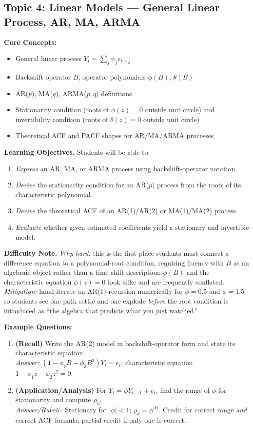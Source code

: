 \documentclass[11pt]{article}
\begin{document}
\subsection{Topic 4: Linear Models --- General Linear Process, AR, MA, ARMA}

\textbf{Core Concepts:}
\begin{itemize}
\item General linear process $Y_t = \sum_j \psi_j e_{t-j}$
\item Backshift operator $B$; operator polynomials $\phi(B)$, $\theta(B)$
\item AR($p$), MA($q$), ARMA($p,q$) definitions
\item Stationarity condition (roots of $\phi(z)=0$ outside unit circle) and invertibility condition (roots of $\theta(z)=0$ outside unit circle)
\item Theoretical ACF and PACF shapes for AR/MA/ARMA processes
\end{itemize}

\textbf{Learning Objectives.} Students will be able to:
\begin{enumerate}
\item \emph{Express} an AR, MA, or ARMA process using backshift-operator notation.
\item \emph{Derive} the stationarity condition for an AR($p$) process from the roots of its characteristic polynomial.
\item \emph{Derive} the theoretical ACF of an AR(1)/AR(2) or MA(1)/MA(2) process.
\item \emph{Evaluate} whether given estimated coefficients yield a stationary and invertible model.
\end{enumerate}

\textbf{Difficulty Note.} \emph{Why hard:} this is the first place students must connect a difference equation to a polynomial-root condition, requiring fluency with $B$ as an algebraic object rather than a time-shift description; $\phi(B)$ and the characteristic equation $\phi(z)=0$ look alike and are frequently conflated. \emph{Mitigation:} hand-iterate an AR(1) recursion numerically for $\phi=0.5$ and $\phi=1.5$ so students see one path settle and one explode \emph{before} the root condition is introduced as ``the algebra that predicts what you just watched.''

\textbf{Example Questions:}
\begin{enumerate}
\item \textbf{(Recall)} Write the AR(2) model in backshift-operator form and state its characteristic equation. \\
\emph{Answer:} $(1-\phi_1 B - \phi_2 B^2)Y_t = e_t$; characteristic equation $1-\phi_1 z - \phi_2 z^2=0$.
\item \textbf{(Application/Analysis)} For $Y_t=\phi Y_{t-1}+e_t$, find the range of $\phi$ for stationarity and compute $\rho_k$. \\
\emph{Answer/Rubric:} Stationary for $|\phi|<1$; $\rho_k = \phi^{|k|}$. Credit for correct range \emph{and} correct ACF formula; partial credit if only one is correct.
\end{enumerate}
\end{document}
